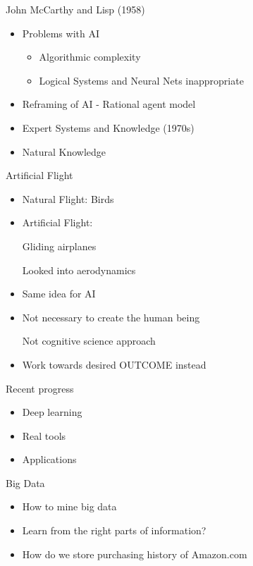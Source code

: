 John McCarthy and Lisp (1958)
\begin{itemize}
  \item Problems with AI
        \begin{itemize}
          \item Algorithmic complexity
	   \item Logical Systems and Neural Nets inappropriate
        \end{itemize}
  \item Reframing of AI - Rational agent model
  \item Expert Systems and Knowledge (1970s)
  \item Natural Knowledge 
\end{itemize}

Artificial Flight
\begin{itemize}
  \item Natural Flight: Birds
  \item Artificial Flight: 

	 Gliding airplanes 

	 Looked into aerodynamics
  \item Same idea for AI 
  \item Not necessary to create the human being

	 Not cognitive science approach
  \item Work towards desired OUTCOME instead
\end{itemize}

Recent progress
\begin{itemize}
  \item Deep learning
  \item Real tools
  \item Applications 
\end{itemize}

Big Data
\begin{itemize}
  \item How to mine big data
  \item Learn from the right parts of information?
  \item How do we store purchasing history of Amazon.com
\end{itemize}




